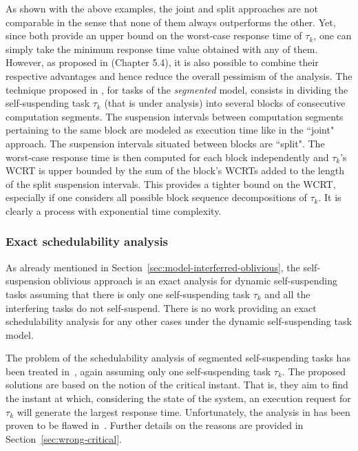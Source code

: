 As shown with the above examples, the joint and split approaches are not comparable in the sense that none 
of them always outperforms the other. Yet, since both provide an upper bound on the worst-case response time of $\tau_k$, one can 
simply take the minimum response time value obtained with any of them. However, as proposed in \cite{bletsas:thesis} (Chapter 5.4), 
it is also possible to combine their respective advantages and hence reduce the overall pessimism of the analysis. 
The technique proposed in \cite{bletsas:thesis}, for tasks of the \emph{segmented} model,
consists in dividing the self-suspending task $\tau_k$ (that is under analysis) into several blocks of consecutive 
computation segments. The suspension intervals between computation segments pertaining to the same block are modeled as execution time 
like in the ``joint" approach. The suspension intervals situated between blocks are ``split". The worst-case response time is then computed for each 
block independently and $\tau_k$'s WCRT is upper bounded by the sum of the block's WCRTs added to the length of the split suspension 
intervals. This provides a tighter bound on the WCRT, especially if one considers all possible block sequence decompositions of $\tau_k$. 
It is clearly a process with exponential time complexity.

\subsubsection{Exact schedulability analysis}

As already mentioned in Section~\ref{sec:model-interferred-oblivious}, the self-suspension oblivious approach is an exact analysis for dynamic 
self-suspending tasks assuming that there is only one self-suspending task $\tau_k$ and all the interfering tasks do not self-suspend. 
There is no work providing an exact schedulability analysis for any other cases under the dynamic self-suspending task model.

The problem of the schedulability analysis of segmented self-suspending tasks has been treated in~\cite{LR:rtas10,ecrts15nelissen}, 
again assuming only one self-suspending task $\tau_k$. The proposed solutions are based on the notion of the critical instant. 
That is, they aim to find the instant at which, considering the state of the system, an execution request for $\tau_k$ will 
generate the largest response time. Unfortunately, the analysis in \cite{LR:rtas10} has been proven to be flawed in~\cite{ecrts15nelissen}. 
Further details on the reasons are provided in Section~\ref{sec:wrong-critical}.


